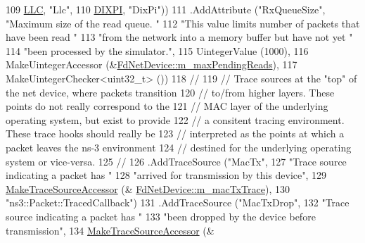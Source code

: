 \begin{DoxyCode}
109                                     \hyperlink{classns3_1_1FdNetDevice_abdacbf10c181f50998a98e7688016618ac6f7f5fa39999c05c1b1c2c5e5dd8889}{LLC}, \textcolor{stringliteral}{"Llc"},
110                                     \hyperlink{classns3_1_1FdNetDevice_abdacbf10c181f50998a98e7688016618abbad9c0d0fe0604652f21e33cf4d8798}{DIXPI}, \textcolor{stringliteral}{"DixPi"}))
111     .AddAttribute (\textcolor{stringliteral}{"RxQueueSize"}, \textcolor{stringliteral}{"Maximum size of the read queue.  "}
112                    \textcolor{stringliteral}{"This value limits number of packets that have been read "}
113                    \textcolor{stringliteral}{"from the network into a memory buffer but have not yet "}
114                    \textcolor{stringliteral}{"been processed by the simulator."},
115                    UintegerValue (1000),
116                    MakeUintegerAccessor (&\hyperlink{classns3_1_1FdNetDevice_a4be8b630492f263f0cb5f9c5fd223eac}{FdNetDevice::m\_maxPendingReads}),
117                    MakeUintegerChecker<uint32\_t> ())
118     \textcolor{comment}{//}
119     \textcolor{comment}{// Trace sources at the "top" of the net device, where packets transition}
120     \textcolor{comment}{// to/from higher layers.  These points do not really correspond to the}
121     \textcolor{comment}{// MAC layer of the underlying operating system, but exist to provide}
122     \textcolor{comment}{// a consitent tracing environment.  These trace hooks should really be}
123     \textcolor{comment}{// interpreted as the points at which a packet leaves the ns-3 environment}
124     \textcolor{comment}{// destined for the underlying operating system or vice-versa.}
125     \textcolor{comment}{//}
126     .AddTraceSource (\textcolor{stringliteral}{"MacTx"},
127                      \textcolor{stringliteral}{"Trace source indicating a packet has "}
128                      \textcolor{stringliteral}{"arrived for transmission by this device"},
129                      \hyperlink{group__tracing_gab21a770b9855af4e8f69f7531ea4a6b0}{MakeTraceSourceAccessor} (&
      \hyperlink{classns3_1_1FdNetDevice_a7a067bc7ab39f2ebfcc925a58da4f519}{FdNetDevice::m\_macTxTrace}),
130                      \textcolor{stringliteral}{"ns3::Packet::TracedCallback"})
131     .AddTraceSource (\textcolor{stringliteral}{"MacTxDrop"},
132                      \textcolor{stringliteral}{"Trace source indicating a packet has "}
133                      \textcolor{stringliteral}{"been dropped by the device before transmission"},
134                      \hyperlink{group__tracing_gab21a770b9855af4e8f69f7531ea4a6b0}{MakeTraceSourceAccessor} (&

\end{DoxyCode}
